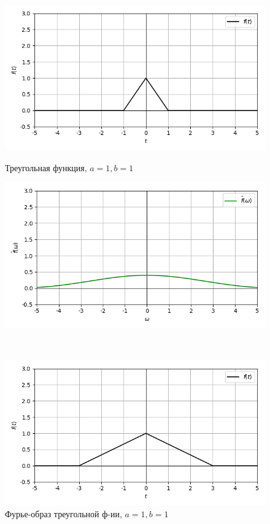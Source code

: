 \documentclass[a4paper]{article}
\begin{document}
\begin{figure}[H]
    \begin{minipage}{0.5\textwidth}
        \centering \includegraphics[width=\textwidth]{triangular/real_graph_1_1.png}
        \caption{Треугольная функция, $a = 1, b = 1$}
    \end{minipage}\hfill
    \begin{minipage}{0.5\textwidth}
        \centering \includegraphics[width=\textwidth]{triangular/real_fourier_1_1.png}
        \caption{Фурье-образ треугольной ф-ии, $a = 1, b = 1$}
    \end{minipage}\\[1em]
        \begin{minipage}{0.5\textwidth}
        \centering \includegraphics[width=\textwidth]{triangular/real_graph_1_3.png}

\end{minipage}
\end{figure}
\end{document}
